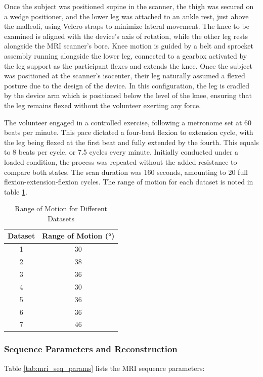\documentclass{micro-econ-thesis}
\begin{document}
Once the subject was positioned supine in the scanner, the thigh was secured on a wedge positioner, and the lower leg was attached to an ankle rest, just above the malleoli, using Velcro straps to minimize lateral movement. The knee to be examined is aligned with the device’s axis of rotation, while the other leg rests alongside the MRI scanner's bore.  Knee motion is guided by a belt and sprocket assembly running alongside the lower leg, connected to a gearbox activated by the leg support as the participant flexes and extends the knee. Once the subject was positioned at the scanner's isocenter, their leg naturally assumed a flexed posture due to the design of the device. In this configuration, the leg is cradled by the device arm which is positioned below the level of the knee, ensuring that the leg remains flexed without the volunteer exerting any force.


The volunteer engaged in a controlled exercise, following a metronome set at 60 beats per minute. This pace dictated a four-beat flexion to extension cycle, with the leg being flexed at the first beat and fully extended by the fourth. This equals to 8 beats per cycle, or 7.5 cycles every minute. Initially conducted under a loaded condition, the process was repeated without the added resistance to compare both states. The scan duration was 160 seconds, amounting to 20 full flexion-extension-flexion cycles. The range of motion for each dataset is noted in table \ref{tab:range_of_motion}. 

\begin{table}[H]
	\centering
	
	\caption{Range of Motion for Different Datasets}
	\label{tab:range_of_motion}
	\begin{tabular}{cc}
		\toprule
		Dataset & Range of Motion (°) \\
		\midrule
		1 & 30 \\
		2 & 38 \\
		3 & 36 \\
		4 & 30 \\
		5 & 36 \\
		6 & 36 \\
		7 & 46 \\
		\bottomrule
	\end{tabular}
	
	
\end{table}

\subsubsection{Sequence Parameters and Reconstruction}
Table \ref{tab:mri_seq_params} lists the MRI sequence parameters:
\end{document}
